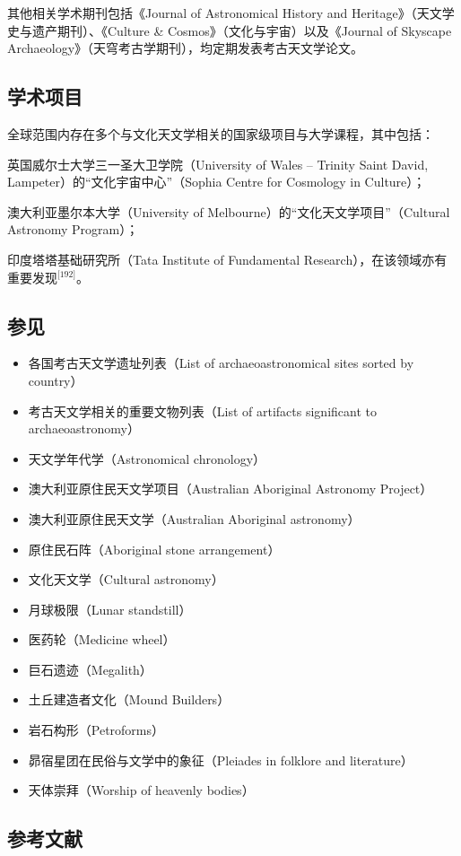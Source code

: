 其他相关学术期刊包括《Journal of Astronomical History and Heritage》（天文学史与遗产期刊）、《Culture \& Cosmos》（文化与宇宙）以及《Journal of Skyscape Archaeology》（天穹考古学期刊），均定期发表考古天文学论文。
\subsection{学术项目}
全球范围内存在多个与文化天文学相关的国家级项目与大学课程，其中包括：

英国威尔士大学三一圣大卫学院（University of Wales – Trinity Saint David, Lampeter）的“文化宇宙中心”（Sophia Centre for Cosmology in Culture）；

澳大利亚墨尔本大学（University of Melbourne）的“文化天文学项目”（Cultural Astronomy Program）；

印度塔塔基础研究所（Tata Institute of Fundamental Research），在该领域亦有重要发现\(^\text{[192]}\)。
\subsection{参见}
\begin{itemize}
    \item 各国考古天文学遗址列表（List of archaeoastronomical sites sorted by country）
    \item 考古天文学相关的重要文物列表（List of artifacts significant to archaeoastronomy）
    \item 天文学年代学（Astronomical chronology）
    \item 澳大利亚原住民天文学项目（Australian Aboriginal Astronomy Project）
    \item 澳大利亚原住民天文学（Australian Aboriginal astronomy）
    \item 原住民石阵（Aboriginal stone arrangement）
    \item 文化天文学（Cultural astronomy）
    \item 月球极限（Lunar standstill）
    \item 医药轮（Medicine wheel）
    \item 巨石遗迹（Megalith）
    \item 土丘建造者文化（Mound Builders）
    \item 岩石构形（Petroforms）
    \item 昴宿星团在民俗与文学中的象征（Pleiades in folklore and literature）
    \item 天体崇拜（Worship of heavenly bodies）
\end{itemize}
\subsection{参考文献}
